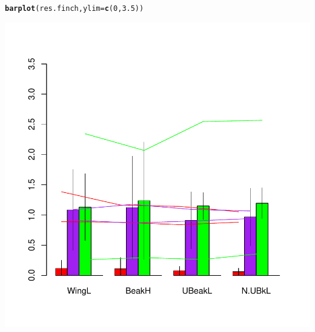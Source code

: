 \documentclass[12pt]{article}\usepackage[]{graphicx}\usepackage[]{color}
\makeatletter
\def\maxwidth{ %
  \ifdim\Gin@nat@width>\linewidth
    \linewidth
  \else
    \Gin@nat@width
  \fi
}
\newcommand{\hlnum}[1]{\textcolor[rgb]{0.686,0.059,0.569}{#1}}%
\newcommand{\hlstd}[1]{\textcolor[rgb]{0.345,0.345,0.345}{#1}}%
\newcommand{\hlkwc}[1]{\textcolor[rgb]{0.333,0.667,0.333}{#1}}%
\newcommand{\hlkwd}[1]{\textcolor[rgb]{0.737,0.353,0.396}{\textbf{#1}}}%
\newenvironment{kframe}{%
 \def\at@end@of@kframe{}%
 \ifinner\ifhmode%
  \def\at@end@of@kframe{\end{minipage}}%
  \begin{minipage}{\columnwidth}%
 \fi\fi%
 \def\FrameCommand##1{\hskip\@totalleftmargin \hskip-\fboxsep
 \colorbox{shadecolor}{##1}\hskip-\fboxsep
     \hskip-\linewidth \hskip-\@totalleftmargin \hskip\columnwidth}%
 \MakeFramed {\advance\hsize-\width
   \@totalleftmargin\z@ \linewidth\hsize
   \@setminipage}}%
 {\par\unskip\endMakeFramed%
 \at@end@of@kframe}
\newenvironment{knitrout}{}{} %
\makeatother
\begin{document}
\begin{knitrout}
\color{fgcolor}\begin{kframe}
\begin{alltt}
\hlkwd{barplot}\hlstd{(res.finch,} \hlkwc{ylim} \hlstd{=} \hlkwd{c}\hlstd{(}\hlnum{0}\hlstd{,} \hlnum{3.5}\hlstd{))}
\end{alltt}
\end{kframe}

{\centering \includegraphics[width=\maxwidth]{figure/unnamed-chunk-23} 

}



\end{knitrout}
\end{document}
